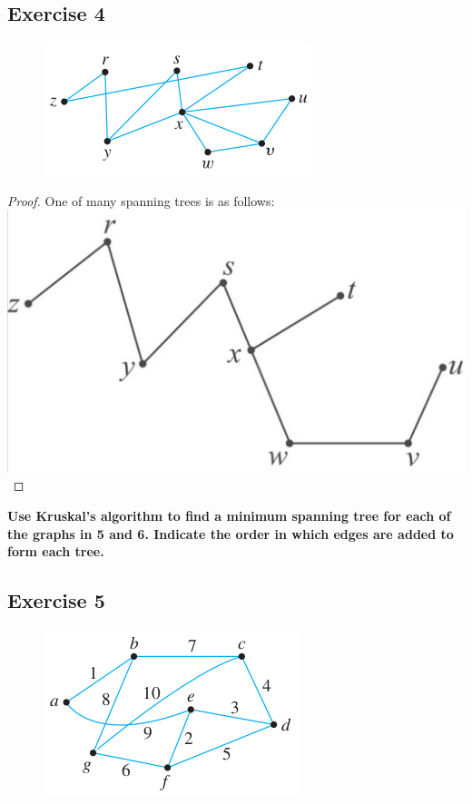 \documentclass[14pt]{extarticle}
\newcommand{\cy}{\color{cyan}}
\begin{document}
\subsection{Exercise 4}
\begin{figure}[ht!]
\centering
\includegraphics[scale=0.5]{../images/10.6.4.png}
\end{figure}

\begin{proof}
One of many spanning trees is as follows:
\includegraphics[scale=0.2]{../images/10.6.4.2.png}
\end{proof}

{\bf \cy Use Kruskal’s algorithm to find a minimum spanning tree for each of the graphs in 5 and 6. Indicate the order in 
which edges are added to form each tree.}

\subsection{Exercise 5}
\begin{figure}[ht!]
\centering
\includegraphics[scale=0.5]{../images/10.6.5.png}
\end{figure}
\end{document}
